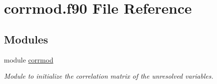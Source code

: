 \hypertarget{corrmod_8f90}{}\section{corrmod.\+f90 File Reference}
\label{corrmod_8f90}
\subsection*{Modules}
\begin{DoxyCompactItemize}
\item 
module \hyperlink{namespacecorrmod}{corrmod}
\begin{DoxyCompactList}\small\item\em Module to initialize the correlation matrix of the unresolved variables. \end{DoxyCompactList}\end{DoxyCompactItemize}
